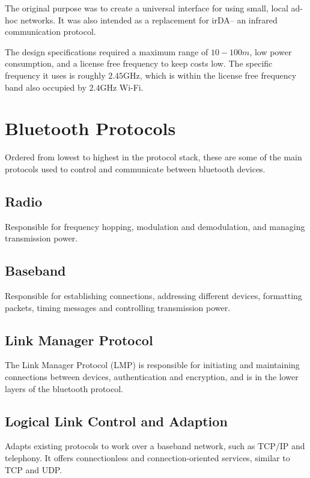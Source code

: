 
The original purpose was to create a universal interface for using small, local ad-hoc networks. It was also intended as
 a replacement for irDA-- an infrared communication protocol.

The design specifications required a maximum range of $10 - 100m$, low power consumption, and a license free frequency
 to keep costs low. The specific frequency it uses is roughly $2.45\mathrm{GHz}$, which is within the license free
 frequency band also occupied by $2.4\mathrm{GHz}$ Wi-Fi.
 
\section*{Bluetooth Protocols}

Ordered from lowest to highest in the protocol stack, these are some of the main protocols used to control and
 communicate between bluetooth devices.

\subsection*{Radio}

Responsible for frequency hopping, modulation and demodulation, and managing transmission power.

\subsection*{Baseband}

Responsible for establishing connections, addressing different devices, formatting packets, timing messages and
 controlling transmission power.

\subsection*{Link Manager Protocol}

The Link Manager Protocol (LMP) is responsible for initiating and maintaining connections between devices,
 authentication and encryption, and is in the lower layers of the bluetooth protocol.

\subsection*{Logical Link Control and Adaption}

Adapts existing protocols to work over a baseband network, such as TCP/IP and telephony. It offers connectionless and
 connection-oriented services, similar to TCP and UDP.

